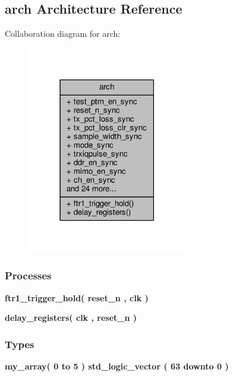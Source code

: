 \subsection{arch Architecture Reference}
\label{classrx__path__top_1_1arch}


Collaboration diagram for arch\+:\nopagebreak
\begin{figure}[H]
\begin{center}
\leavevmode
\includegraphics[width=198pt]{d3/da4/classrx__path__top_1_1arch__coll__graph}
\end{center}
\end{figure}
\subsubsection*{Processes}
 \begin{DoxyCompactItemize}
\item 
{\bf ftr1\+\_\+trigger\+\_\+hold}{\bfseries  ( {\bfseries {\bfseries {\bf reset\+\_\+n}} \textcolor{vhdlchar}{ }} , {\bfseries {\bfseries {\bf clk}} \textcolor{vhdlchar}{ }} )}
\item 
{\bf delay\+\_\+registers}{\bfseries  ( {\bfseries {\bfseries {\bf clk}} \textcolor{vhdlchar}{ }} , {\bfseries {\bfseries {\bf reset\+\_\+n}} \textcolor{vhdlchar}{ }} )}
\end{DoxyCompactItemize}
\subsubsection*{Types}
 \begin{DoxyCompactItemize}
\item 
{\bfseries {\bf my\+\_\+array}{\bfseries \textcolor{vhdlchar}{(}\textcolor{vhdlchar}{ }\textcolor{vhdlchar}{ } \textcolor{vhdldigit}{0} \textcolor{vhdlchar}{ }\textcolor{keywordflow}{to}\textcolor{vhdlchar}{ }\textcolor{vhdlchar}{ } \textcolor{vhdldigit}{5} \textcolor{vhdlchar}{ }\textcolor{vhdlchar}{)}\textcolor{vhdlchar}{ }\textcolor{vhdlchar}{ }\textcolor{comment}{std\+\_\+logic\+\_\+vector}\textcolor{vhdlchar}{ }\textcolor{vhdlchar}{(}\textcolor{vhdlchar}{ }\textcolor{vhdlchar}{ } \textcolor{vhdldigit}{63} \textcolor{vhdlchar}{ }\textcolor{keywordflow}{downto}\textcolor{vhdlchar}{ }\textcolor{vhdlchar}{ } \textcolor{vhdldigit}{0} \textcolor{vhdlchar}{ }\textcolor{vhdlchar}{)}\textcolor{vhdlchar}{ }}} 
\end{DoxyCompactItemize}
